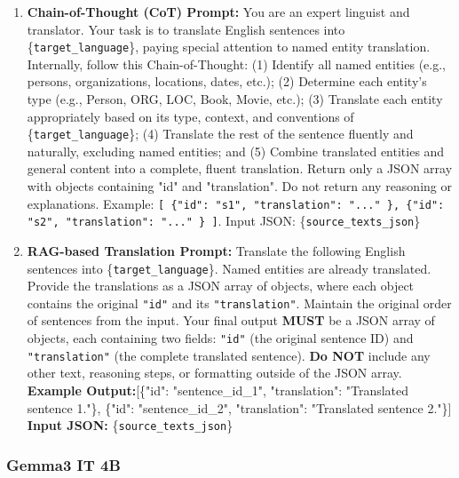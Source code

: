 \documentclass{ecai}
\begin{document}
\begin{enumerate}
    \item \textbf{Chain-of-Thought (CoT) Prompt:} You are an expert linguist and translator. Your task is to translate English sentences into \{\texttt{target\_language}\}, paying special attention to named entity translation. Internally, follow this Chain-of-Thought: (1) Identify all named entities (e.g., persons, organizations, locations, dates, etc.); (2) Determine each entity's type (e.g., Person, ORG, LOC, Book, Movie, etc.); (3) Translate each entity appropriately based on its type, context, and conventions of \{\texttt{target\_language}\}; (4) Translate the rest of the sentence fluently and naturally, excluding named entities; and (5) Combine translated entities and general content into a complete, fluent translation. Return only a JSON array with objects containing "id" and "translation". Do not return any reasoning or explanations. Example: \texttt{[ \{"id": "s1", "translation": "..." \}, \{"id": "s2", "translation": "..." \} ]}. Input JSON: \{\texttt{source\_texts\_json}\}
    \item \textbf{RAG-based Translation Prompt:} Translate the following English sentences into \{\texttt{target\_language}\}. Named entities are already translated. Provide the translations as a JSON array of objects, where each object contains the original \texttt{"id"} and its \texttt{"translation"}. Maintain the original order of sentences from the input. Your final output \textbf{MUST} be a JSON array of objects, each containing two fields: \texttt{"id"} (the original sentence ID) and \texttt{"translation"} (the complete translated sentence). \textbf{Do NOT} include any other text, reasoning steps, or formatting outside of the JSON array.\\\textbf{Example Output:}[\{"id": "sentence\_id\_1", "translation": "Translated sentence 1."\}, \{"id": "sentence\_id\_2", "translation": "Translated sentence 2."\}] \textbf{Input JSON:} \{\texttt{source\_texts\_json}\}
\end{enumerate}


\subsubsection{Gemma3 IT 4B}
\end{document}
